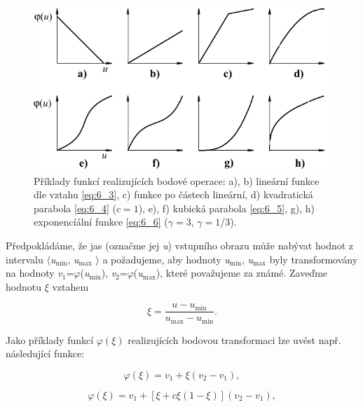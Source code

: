 \begin{figure}[th]
    \begin{center}
        \includegraphics[scale=1.0]{06_bodoveoperace/images/img_6_1.pdf}
    \end{center}
    \caption{Příklady funkcí realizujících bodové operace: a), b) lineární funkce dle vztahu \eqref{eq:6_3}, c) funkce po částech lineární, d) kvadratická parabola \eqref{eq:6_4} ($c=1$), e), f) kubická parabola \eqref{eq:6_5}, g), h) exponencíální funkce \eqref{eq:6_6} ($\gamma = 3$, $\gamma = 1/3$).}
    \label{img:6_1}
\end{figure}

Předpokládáme, že jas (označme jej \textit{u}) vstupního obrazu může nabývat hodnot z intervalu $\langle$\textit{u}$_{\min}$, \textit{u}$_{\max}$ $\rangle$ a požadujeme, aby hodnoty \textit{u}$_{\min}$, \textit{u}$_{\max}$ byly transformovány na hodnoty \textit{v}$_1$=$\varphi$(\textit{u}$_{\min}$), \textit{v}$_2$=$\varphi$(\textit{u}$_{\max}$), které považujeme za známé. Zaveďme hodnotu $\xi$ vztahem

\begin{equation} \label{eq:6_2}
    \xi = \frac{u - u_{\min}}{u_{\max} - u_{\min}}.
\end{equation}

Jako příklady funkcí $\varphi(\xi)$ realizujících bodovou transformaci lze uvést např. následující funkce:

\begin{equation} \label{eq:6_3}
    \varphi(\xi) = v_1 + \xi ( v_2 - v_1 ),
\end{equation}

\begin{equation} \label{eq:6_4}
    \varphi(\xi) = v_1 + \left[ \xi + c \xi ( 1 - \xi ) \right] ( v_2 - v_1 ),
\end{equation}

